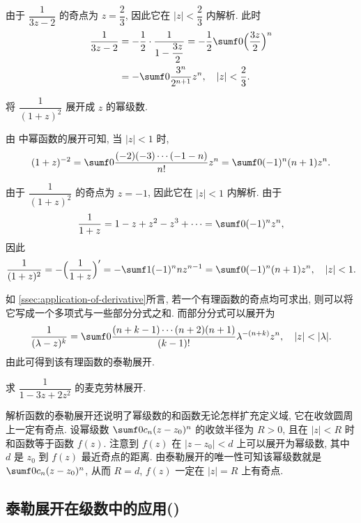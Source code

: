\begin{solution}
  由于 $\dfrac1{3z-2}$ 的奇点为 $z=\dfrac23$, 因此它在 $|z|<\dfrac23$ 内解析.
  此时
  \begin{align*}
     \frac1{3z-2}&
    =-\half\cdot\frac1{1-\dfrac{3z}2}
    =-\half\sumf0 \Bigl(\frac{3z}2\Bigr)^n\\&
    =-\sumf0 \frac{3^n}{2^{n+1}}z^n,
      \quad|z|<\frac23.
  \end{align*}
\end{solution}

\begin{example}
  将 $\dfrac1{(1+z)^2}$ 展开成 $z$ 的幂级数.
\end{example}

\begin{solution}[解法一]
  由 中幂函数的展开可知, 当 $|z|<1$ 时,
  \[
    (1+z)^{-2}=\sumf0 \frac{(-2)(-3)\cdots(-1-n)}{n!}z^n
    =\sumf0 (-1)^n(n+1)z^n.
  \]
\end{solution}

\begin{solution}[解法二]
  由于 $\dfrac1{(1+z)^2}$ 的奇点为 $z=-1$, 因此它在 $|z|<1$ 内解析.
  由于
  \[
     \frac1{1+z}=1-z+z^2-z^3+\cdots
    =\sumf0 (-1)^nz^n,
  \]
  因此
  \[
     \frac1{(1+z)^2}
    =-\Bigl(\frac1{1+z}\Bigr)'
    =-\sumf1 (-1)^n nz^{n-1}
    =\sumf0 (-1)^n (n+1)z^n,\quad |z|<1.
  \]
\end{solution}

如 \ref{ssec:application-of-derivative}所言, 若一个有理函数的奇点均可求出, 则可以将它写成一个多项式与一些部分分式之和.
而部分分式可以展开为
\[
   \frac1{(\lambda-z)^k}
  =\sumf0 \frac{(n+k-1)\cdots(n+2)(n+1)}{(k-1)!}\lambda^{-(n+k)}z^n,\quad |z|<|\lambda|.
\]
由此可得到该有理函数的泰勒展开.

\begin{exercise}
  求 $\dfrac1{1-3z+2z^2}$ 的麦克劳林展开.
\end{exercise}


解析函数的泰勒展开还说明了幂级数的和函数无论怎样扩充定义域, 它在收敛圆周上一定有奇点.
设幂级数 $\sumf0c_n(z-z_0)^n$ 的收敛半径为 $R>0$, 且在 $|z|<R$ 时和函数等于函数 $f(z)$.
注意到 $f(z)$ 在 $|z-z_0|<d$ 上可以展开为幂级数, 其中 $d$ 是 $z_0$ 到 $f(z)$ 最近奇点的距离.
由泰勒展开的唯一性可知该幂级数就是 $\sumf0c_n(z-z_0)^n$, 从而 $R=d$, $f(z)$ 一定在 $|z|=R$ 上有奇点.


\subsection{泰勒展开在级数中的应用(\optional)}


